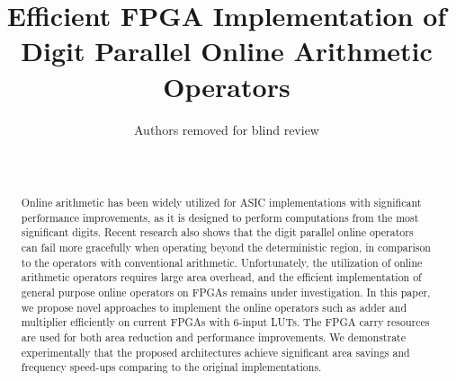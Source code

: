 \documentclass[conference]{IEEEtran}
\begin{document}
\title{Efficient FPGA Implementation of\\ Digit Parallel Online Arithmetic Operators}


\author{Authors removed for blind review\\ \\ \\}

\maketitle


\begin{abstract}
Online arithmetic has been widely utilized for ASIC implementations with significant performance improvements, as it is designed to perform computations from the most significant digits. Recent research also shows that the digit parallel online operators can fail more gracefully when operating beyond the deterministic region, in comparison to the operators with conventional arithmetic. Unfortunately, the utilization of online arithmetic operators requires large area overhead, and the efficient implementation of general purpose online operators on FPGAs remains under investigation. In this paper, we propose novel approaches to implement the online operators such as adder and multiplier efficiently on current FPGAs with 6-input LUTs. The FPGA carry resources are used for both area reduction and performance improvements. We demonstrate experimentally that the proposed architectures achieve significant area savings and frequency speed-ups comparing to the original implementations.





\end{abstract}
\end{document}
